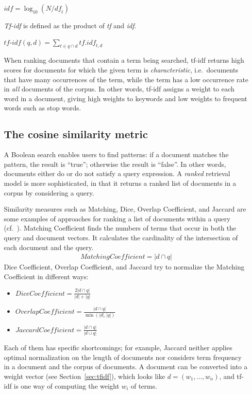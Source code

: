 \documentclass{IOS-Book-Article}
\begin{document}
\begin{center} 
	$\mathit{idf}=\log_{10} (N/\mathit{df}_t)$
\end{center}

\emph{Tf-idf} is defined as the product of \emph{tf} and \emph{idf}. 

\begin{center}
	$\textit{tf-idf}(q,d)=\sum_{t\in q\cap d} \mathit{tf}.\mathit{idf}_{t,d}$
\end{center}

When ranking documents that contain a term being searched, tf-idf returns high scores for documents for which the given term is \emph{characteristic}, i.e.\ documents that have many occurrences of the term, while the term has a low occurrence rate in \emph{all} documents of the corpus.
In other words, tf-idf assigns a weight to each word in a document, giving high weights to keywords and low weights to frequent words such as stop words.

\subsection{The cosine similarity metric}
\label{sec:cosine}
A Boolean search enables users to find patterns: if a document matches the pattern, the result is “true”; otherwise the result is “false”.
In other words, documents either do or do not satisfy a query expression.
A \emph{ranked} retrieval model is more sophisticated, in that it returns a ranked list of documents in a corpus by considering a query. 

Similarity measures such as Matching, Dice, Overlap Coefficient, and Jaccard are some examples of approaches for ranking a list of documents within a query (cf.~\citet{ChristopherD1999}).
Matching Coefficient finds the numbers of terms that occur in both the query and document vectors.
It calculates the cardinality of the intersection of each document and the query.
\begin{align*}
\mathit{Matching Coefficient}=|d\cap q|
\end{align*}
Dice Coefficient, Overlap Coefficient, and Jaccard try to normalize the Matching Coefficient in different ways:
\begin{itemize}
	\item $\mathit{Dice Coefficient}=\frac{2|d\cap q|}{|d|+|q|}$
	\item $\mathit{Overlap Coefficient}=\frac{|d\cap q|}{\min(|d|,|q|)}$
	\item $\mathit{Jaccard Coefficient}=\frac{|d\cap q|}{|d\cup q|}$
\end{itemize}
Each of them has specific shortcomings;
for example, Jaccard neither applies optimal normalization on the length of documents nor considers term frequency in a document and the corpus of documents.
A document can be converted into a weight vector (see Section~\ref{sec:tfidf}), which looks like $d=(w_1,\dots,w_n)$, and tf-idf is one way of computing the weight $w_i$ of terms.
\end{document}
